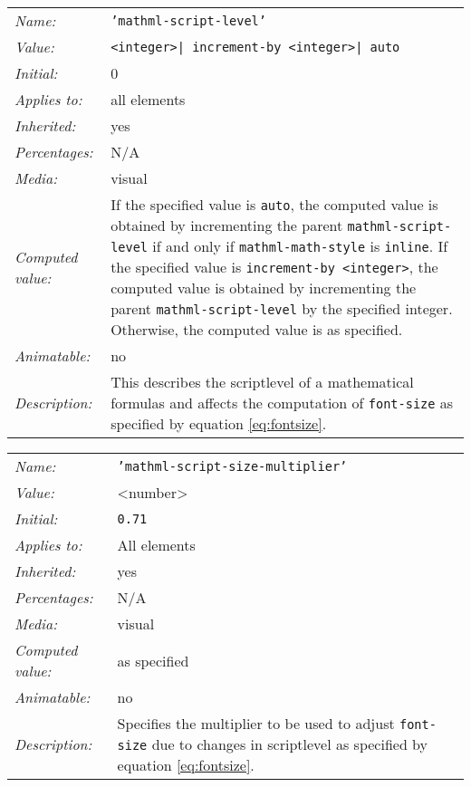 \begin{table}
\begin{tabular}{ll}
  \emph{Name:} & {\tt 'mathml-script-level'} \\
  \emph{Value:} &
       {\tt \textless integer\textgreater |
         increment-by \textless integer\textgreater | auto} \\
  \emph{Initial:} & 0 \\
  \emph{Applies to:} & all elements \\
  \emph{Inherited:} & yes \\
  \emph{Percentages:} & N/A \\
  \emph{Media:} & visual \\
  \emph{Computed value:} &
  If the specified value is {\tt auto}, the computed value is obtained by
  incrementing the parent {\tt mathml-script-level} if and only if
  {\tt mathml-math-style} is {\tt inline}.
  If the specified value is {\tt increment-by \textless integer\textgreater},
  the computed value is obtained by
  incrementing the parent {\tt mathml-script-level} by the specified integer.
  Otherwise, the computed value is as specified. \\
  \emph{Animatable:} & no \\
  \emph{Description:} & This describes the scriptlevel of a mathematical
  formulas and affects the computation of {\tt font-size} as specified by
  equation \ref{eq:fontsize}.
\end{tabular}
\label{tab:CSSScriptLevel}
\end{table}

\begin{table}
\begin{tabular}{ll}
  \emph{Name:} & {\tt 'mathml-script-size-multiplier'} \\
  \emph{Value:} & \textless number\textgreater \\
  \emph{Initial:} & {\tt 0.71} \\
  \emph{Applies to:} & All elements \\
  \emph{Inherited:} & yes \\
  \emph{Percentages:} & N/A \\
  \emph{Media:} & visual \\
  \emph{Computed value:} & as specified \\
  \emph{Animatable:} & no \\
  \emph{Description:} & Specifies the multiplier to be used to adjust
       {\tt font-size} due to changes in scriptlevel as specified by equation
       \ref{eq:fontsize}.
\end{tabular}
\label{tab:CSSScriptSizeMultiplier}
\end{table}

